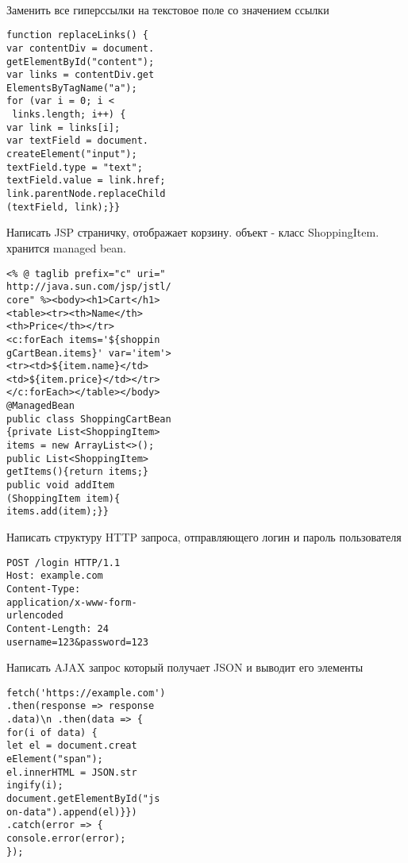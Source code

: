 \documentclass{article}
\begin{document}
\\
\begin{minipage}{.2\textwidth}
Заменить все гиперссылки на текстовое поле со значением ссылки
\begin{lstlisting}
function replaceLinks() {
var contentDiv = document.
getElementById("content");
var links = contentDiv.get
ElementsByTagName("a");
for (var i = 0; i <
 links.length; i++) {
var link = links[i];
var textField = document.
createElement("input");
textField.type = "text";
textField.value = link.href;
link.parentNode.replaceChild
(textField, link);}}
\end{lstlisting}
\end{minipage}
\hfill
\begin{minipage}{.2\textwidth}
Написать JSP страничку, отображает корзину. 
объект - класс ShoppingItem. хранится managed bean.
\begin{lstlisting}
<% @ taglib prefix="c" uri="
http://java.sun.com/jsp/jstl/
core" %><body><h1>Cart</h1>
<table><tr><th>Name</th>
<th>Price</th></tr>
<c:forEach items='${shoppin
gCartBean.items}' var='item'>
<tr><td>${item.name}</td>
<td>${item.price}</td></tr>
</c:forEach></table></body>
@ManagedBean
public class ShoppingCartBean
{private List<ShoppingItem> 
items = new ArrayList<>();
public List<ShoppingItem> 
getItems(){return items;}
public void addItem
(ShoppingItem item){
items.add(item);}}
\end{lstlisting}
\end{minipage}
\hfill
\begin{minipage}{.2\textwidth}
Написать структуру HTTP запроса, отправляющего логин и пароль пользователя
\begin{lstlisting}
POST /login HTTP/1.1
Host: example.com
Content-Type: 
application/x-www-form-
urlencoded
Content-Length: 24
username=123&password=123
\end{lstlisting}
\end{minipage}
\hfill
\begin{minipage}{.2\textwidth}
Написать AJAX запрос который получает JSON и выводит его элементы
\begin{lstlisting}
fetch('https://example.com')
.then(response => response
.data)\n .then(data => {
for(i of data) {
let el = document.creat
eElement("span");
el.innerHTML = JSON.str
ingify(i);
document.getElementById("js
on-data").append(el)}})
.catch(error => {
console.error(error);
});
\end{lstlisting}
\end{minipage}
\\
\end{document}
